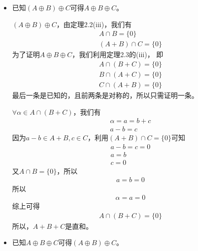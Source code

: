 \documentclass{article}
\begin{document}
\begin{itemize}
  \item 已知$(A \oplus B) \oplus C$可得$A \oplus B \oplus C$。

        $(A \oplus B) \oplus C$，由定理2.2(iii)，我们有
        \begin{align*}
          A \cap B = \{0\} \\
          (A + B) \cap C = \{0\}
        \end{align*}
        为了证明$A \oplus B \oplus C$，我们利用定理2.3的(iii)，
        即
        \begin{align*}
          A \cap (B + C) = \{0\} \\
          B \cap (A + C) = \{0\} \\
          C \cap (A + B) = \{0\}
        \end{align*}
        最后一条是已知的，且前两条是对称的，所以只需证明一条。

        $\forall \alpha \in A \cap (B + C)$，我们有
        \begin{align*}
          \alpha = a = b + c \\
          a - b = c
        \end{align*}
        因为$a - b \in A + B, c \in C$，利用$(A + B) \cap C = \{0\} $可知
        \begin{align*}
          a - b = c = 0 \\
          a = b         \\
          c = 0
        \end{align*}
        又$A \cap B = \{0\}$，所以
        \begin{align*}
          a = b = 0
        \end{align*}
        所以
        \begin{align*}
          \alpha = a = 0
        \end{align*}
        综上可得
        \begin{align*}
          A \cap (B + C) = \{0\}
        \end{align*}
        所以，$A + B + C$是直和。

  \item 已知$A \oplus B \oplus C$可得$(A \oplus B) \oplus C$。


\end{itemize}
\end{document}
